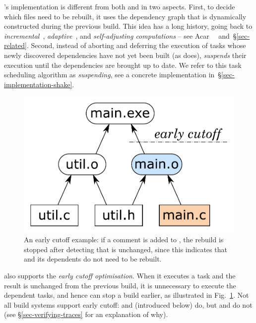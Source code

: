 \Shake's implementation is different from both \Make and \Excel in two aspects.
First, to decide which files need to be rebuilt,
it uses the dependency graph that is dynamically constructed during
the previous build. This idea has a long history, going back to
\emph{incremental}~\cite{demers1981incremental},
\emph{adaptive}~\cite{acar2002adaptive}, and
\emph{self-adjusting computations} -- see
Acar~\etal~ and~\S\ref{sec-related}. Second,
instead of aborting and deferring the execution of tasks whose newly discovered
dependencies have not yet been built (as \Excel does), \Shake \emph{suspends}
their execution until the dependencies are brought up to date. We refer to this
task scheduling algorithm as \emph{suspending}, see a concrete implementation
in~\S\ref{sec-implementation-shake}.

\begin{figure}
\centerline{\includegraphics[scale=0.28]{fig/shake-example-cutoff.pdf}}
\caption{An early cutoff example: if a comment is added to , the
rebuild is stopped after detecting that  is unchanged, since this
indicates that  and its dependents do not need to be
rebuilt.\label{fig-cutoff}}
\end{figure}

\Shake also supports the \emph{early cutoff optimisation}. When it
executes a task and the result is unchanged from the previous build, it is
unnecessary to execute the dependent tasks, and hence \Shake can stop a build
earlier, as illustrated in Fig.~\ref{fig-cutoff}. Not all build systems support
early cutoff: \Shake and \Bazel (introduced below) do, but \Make and \Excel do
not (see \S\ref{sec-verifying-traces} for an explanation of why).

